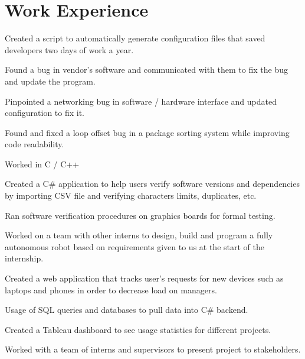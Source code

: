 \documentclass[]{deedy-resume-openfont}
\begin{document}
\section{Work Experience}
\hfill {}
\begin{tightemize}
	\item Created a script to automatically generate configuration files that saved developers two days of work a year.
	\item Found a bug in vendor's software and communicated with them to fix the bug and update the program.
	\item Pinpointed a networking bug in software / hardware interface and updated configuration to fix it.
	\item Found and fixed a loop offset bug in a package sorting system while improving code readability.
	\item Worked in C / C++
\end{tightemize}
\sectionsep
{}\hfill {}
\begin{tightemize}
	\item Created a C\# application to help users verify software versions and dependencies by importing CSV file and verifying characters limits, duplicates, etc.
	\item Ran software verification procedures on graphics boards for formal testing.
	\item Worked on a team with other interns to design, build and program a fully autonomous robot based on requirements given to us at the start of the internship.
\end{tightemize}
\sectionsep
{}\hfill {}
\begin{tightemize}
	\item Created a web application that tracks user’s requests for new devices such as laptops and phones in order to decrease load on managers.
	\item Usage of SQL queries and databases to pull data into C\# backend.
	\item Created a Tableau dashboard to see usage statistics for different projects.
	\item Worked with a team of interns and supervisors to present project to stakeholders.
\end{tightemize}
\sectionsep
%
%
\end{document}
